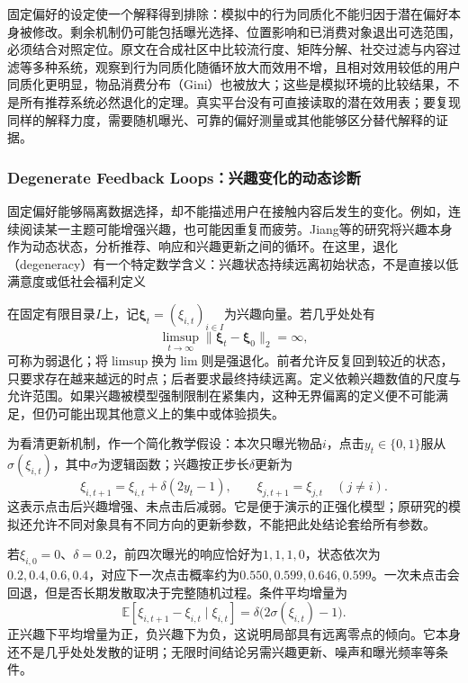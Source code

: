 固定偏好的设定使一个解释得到排除：模拟中的行为同质化不能归因于潜在偏好本身被修改。剩余机制仍可能包括曝光选择、位置影响和已消费对象退出可选范围，必须结合对照定位。原文在合成社区中比较流行度、矩阵分解、社交过滤与内容过滤等多种系统，观察到行为同质化随循环放大而效用不增，且相对效用较低的用户同质化更明显，物品消费分布（Gini）也被放大；这些是模拟环境的比较结果，不是所有推荐系统必然退化的定理。真实平台没有可直接读取的潜在效用表；要复现同样的解释力度，需要随机曝光、可靠的偏好测量或其他能够区分替代解释的证据。

\Needspace{100mm}
\subsubsection{Degenerate Feedback Loops：兴趣变化的动态诊断}
\label{sec:rs-degenerate-feedback}

固定偏好能够隔离数据选择，却不能描述用户在接触内容后发生的变化。例如，连续阅读某一主题可能增强兴趣，也可能因重复而疲劳。Jiang等的研究将兴趣本身作为动态状态，分析推荐、响应和兴趣更新之间的循环。在这里，退化（degeneracy）有一个特定数学含义：兴趣状态持续远离初始状态，不是直接以低满意度或低社会福利定义

在固定有限目录$I$上，记$\bm{\xi}_t=(\xi_{i,t})_{i\in I}$为兴趣向量。若几乎处处有
\[
 \limsup_{t\to\infty}
 \lVert\bm{\xi}_t-\bm{\xi}_0\rVert_2=\infty,
\]
可称为弱退化；将$\limsup$换为$\lim$则是强退化。前者允许反复回到较近的状态，只要求存在越来越远的时点；后者要求最终持续远离。定义依赖兴趣数值的尺度与允许范围。如果兴趣被模型强制限制在紧集内，这种无界偏离的定义便不可能满足，但仍可能出现其他意义上的集中或体验损失。

为看清更新机制，作一个简化教学假设：本次只曝光物品$i$，点击$y_t\in\{0,1\}$服从$\sigma(\xi_{i,t})$，其中$\sigma$为逻辑函数；兴趣按正步长$\delta$更新为
\begin{equation}
 \xi_{i,t+1}=\xi_{i,t}+\delta(2y_t-1),
 \qquad
 \xi_{j,t+1}=\xi_{j,t}\quad(j\ne i).
 \label{eq:rs-interest-reinforcement}
\end{equation}
这表示点击后兴趣增强、未点击后减弱。它是便于演示的正强化模型；原研究的模拟还允许不同对象具有不同方向的更新参数，不能把此处结论套给所有参数。

若$\xi_{i,0}=0$、$\delta=0.2$，前四次曝光的响应恰好为$1,1,1,0$，状态依次为$0.2,0.4,0.6,0.4$，对应下一次点击概率约为$0.550,0.599,0.646,0.599$。一次未点击会回退，但是否长期发散取决于完整随机过程。条件平均增量为
\[
 \mathbb{E}[\xi_{i,t+1}-\xi_{i,t}\mid\xi_{i,t}]
 =\delta\bigl(2\sigma(\xi_{i,t})-1\bigr).
\]
正兴趣下平均增量为正，负兴趣下为负，这说明局部具有远离零点的倾向。它本身还不是几乎处处发散的证明；无限时间结论另需兴趣更新、噪声和曝光频率等条件。

